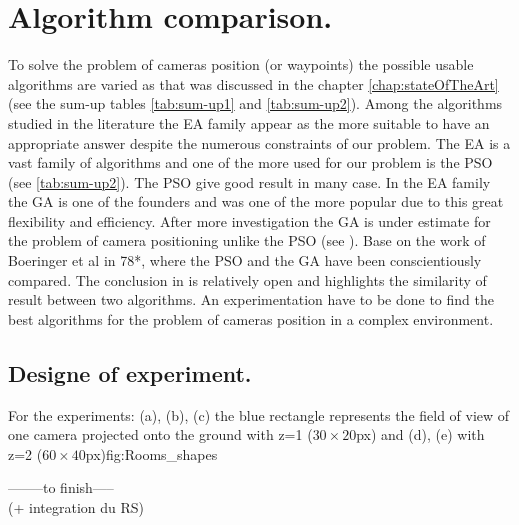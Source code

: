 \section{Algorithm comparison.}\label{sec:GAvsPSO} 
%
To solve the problem of cameras position (or waypoints) the possible usable algorithms are varied as that was discussed in the chapter \ref{chap:stateOfTheArt} (see the sum-up tables \ref{tab:sum-up1} and \ref{tab:sum-up2}).
Among the algorithms studied in the literature the EA family appear as the more suitable to have an appropriate answer despite the numerous constraints of our problem. The EA is a vast family of algorithms and one of the more used for our problem is the PSO (see \ref{tab:sum-up2}). The PSO give good result in many case. In the EA family the GA is one of the founders and was one of the more popular due to this great flexibility and efficiency.
 After more investigation the GA is under estimate for the problem of camera positioning unlike the PSO (see \citep{33*reddy2012,8*zhou2011,84*xu2011,143*maji2015,193*fu2014,194*fu2010}).
 Base on the work of Boeringer et al in \citep{78*boeringer2004}78*, where the PSO and the GA have been conscientiously compared. The conclusion in \citep{78*boeringer2004} is relatively open and highlights the similarity of result between two algorithms. An experimentation have to be done to find the best algorithms for the problem of cameras position in a complex environment. 




\subsection{Designe of experiment.}\label{sec:DoE}
\begin{mfigures}[!]{For the experiments: (a), (b), (c) the blue rectangle represents the field of view of one camera projected onto the ground  with z=1 ($30 \times 20 $px) and (d), (e) with z=2 ($60 \times 40 $px)}{fig:Rooms_shapes} \centering
{}
\hspace{1cm}
\hspace{1cm}
\end{mfigures}
--------to finish-----\\ (+ integration du RS)\\

